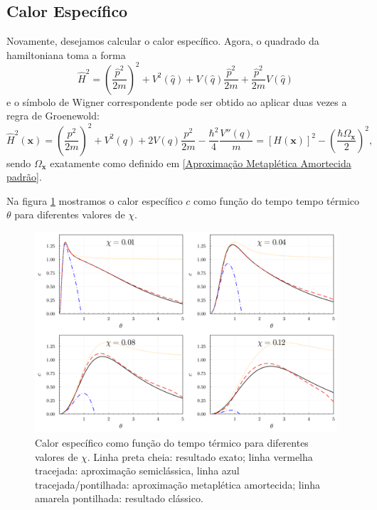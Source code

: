 \documentclass[
	12pt,
	oneside,			%
	a4paper,			%
	english,			%
	brazil				%
	]{abntex2}
\theoremstyle{definition}
\begin{document}
\subsection{Calor Específico}

Novamente, desejamos calcular o calor específico. Agora, o quadrado da hamiltoniana toma a forma
\begin{equation}
    \hat{H}^2 = \left( \frac{\hat{p}^2}{2m} \right)^2 + V^2\left( \hat{q} \right) + V\left( \hat{q} \right)\frac{\hat{p}^2}{2m} + \frac{\hat{p}^2}{2m}V\left( \hat{q} \right)
\end{equation}
e o símbolo de Wigner correspondente pode ser obtido ao aplicar duas vezes a regra de Groenewold:
\begin{equation}
    \hat{H}^2(\mathbf{x}) = \left( \frac{p^2}{2m} \right)^2 + V^2\left( q \right) + 2V\left( q \right)\frac{p^2}{2m} - \frac{\hbar^2}{4} \frac{V''(q)}{m} = \left[ H(\mathbf{x}) \right]^2 - \left( \frac{\hbar \Omega_\mathbf{x}}{2} \right)^2,
\end{equation}
sendo $\Omega_\mathbf{x}$ exatamente como definido em \eqref{Aproximação Metaplética Amortecida padrão}.

Na figura \ref{calores morse} mostramos o calor específico $c$ como função do tempo tempo térmico $\theta$ para diferentes valores de $\chi$.

\begin{figure}[H]
    \includegraphics[width=\textwidth]{Imagens/calores_morse.png}
    \centering
    \caption{Calor específico como função do tempo térmico para diferentes valores de $\chi$. Linha preta cheia: resultado exato; linha vermelha tracejada: aproximação semiclássica, linha azul tracejada/pontilhada: aproximação metaplética amortecida; linha amarela pontilhada: resultado clássico.}
    \label{calores morse}
\end{figure}
\end{document}

